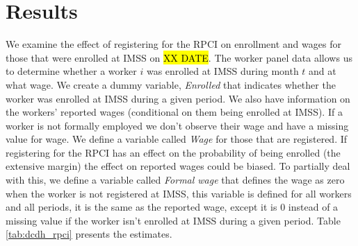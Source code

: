 \documentclass[oneside,11pt]{article}
\begin{document}


\section{Results} \label{results}

We examine the effect of registering for the RPCI on enrollment and wages for those that were enrolled at IMSS on \hl{XX DATE}. The worker panel data allows us to determine whether a worker $i$ was enrolled at IMSS during month $t$ and at what wage. We create a dummy variable, \textit{Enrolled} that indicates whether the worker was enrolled at IMSS during a given period. We also have information on the workers' reported wages (conditional on them being enrolled at IMSS). If a worker is not formally employed we don't observe their wage and have a missing value for wage. We define a variable called \textit{Wage} for those that are registered. If registering for the RPCI has an effect on the probability of being enrolled (the extensive margin) the effect on reported wages could be biased. To partially deal with this, we define a variable called \textit{Formal wage} that defines the wage as zero when the worker is not registered at IMSS, this variable is defined for all workers and all periods, it is the same as the reported wage, except it is 0 instead of a missing value if the worker isn't enrolled at IMSS during a given period. Table \ref{tab:dcdh_rpci} presents the estimates. 
\end{document}
